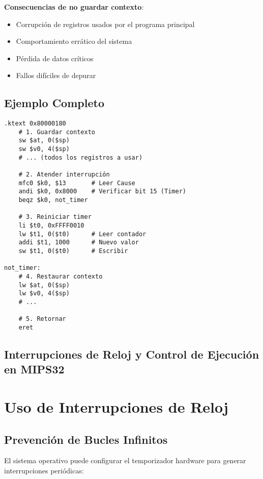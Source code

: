 \documentclass{article}
\begin{document}
\textbf{Consecuencias de no guardar contexto}:
\begin{itemize}
    \item Corrupción de registros usados por el programa principal
    \item Comportamiento errático del sistema
    \item Pérdida de datos críticos
    \item Fallos difíciles de depurar
\end{itemize}

\subsection{Ejemplo Completo}
\begin{verbatim}
.ktext 0x80000180
    # 1. Guardar contexto
    sw $at, 0($sp)
    sw $v0, 4($sp)
    # ... (todos los registros a usar)

    # 2. Atender interrupción
    mfc0 $k0, $13       # Leer Cause
    andi $k0, 0x8000    # Verificar bit 15 (Timer)
    beqz $k0, not_timer
    
    # 3. Reiniciar timer
    li $t0, 0xFFFF0010
    lw $t1, 0($t0)      # Leer contador
    addi $t1, 1000      # Nuevo valor
    sw $t1, 0($t0)      # Escribir

not_timer:
    # 4. Restaurar contexto
    lw $at, 0($sp)
    lw $v0, 4($sp)
    # ...

    # 5. Retornar
    eret
\end{verbatim}
\subsection{Interrupciones de Reloj y Control de Ejecución en MIPS32}
\section{Uso de Interrupciones de Reloj}

\subsection{Prevención de Bucles Infinitos}
El sistema operativo puede configurar el temporizador hardware para generar interrupciones periódicas:
\end{document}
